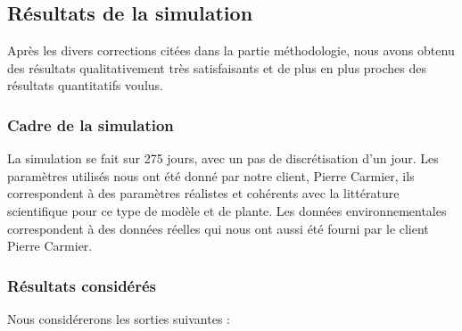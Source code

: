 \subsection{Résultats de la simulation}

Après les divers corrections citées dans la partie méthodologie, nous avons obtenu des résultats qualitativement très satisfaisants et de plus en plus proches des résultats quantitatifs voulus. 

\subsubsection{Cadre de la simulation}

La simulation se fait sur 275 jours, avec un pas de discrétisation d'un jour. Les paramètres utilisés nous ont été donné par notre client, Pierre Carmier, ils correspondent à des paramètres réalistes et cohérents avec la littérature scientifique pour ce type de modèle et de plante. Les données environnementales correspondent à des données réelles qui nous ont aussi été fourni par le client Pierre Carmier.

\subsubsection{Résultats considérés}

Nous considérerons les sorties suivantes :


